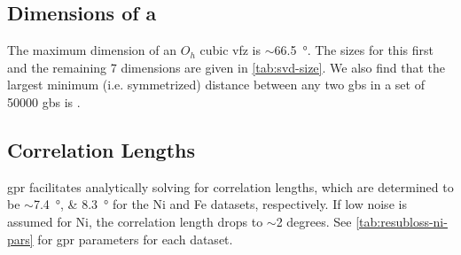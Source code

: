\documentclass[final,twocolumn,12pt]{elsarticle}
\begin{document}
	\subsection{Dimensions of a } \label{sec:results:dimensions}
	
	The maximum dimension of an $O_h$ cubic \gls{vfz} is $\sim$\SI{66.5}{\degree}. The sizes for this first and the remaining 7 dimensions are given in \cref{tab:svd-size}. We also find that the largest minimum (i.e. symmetrized) distance between any two \glspl{gb} in a set of \num{50000} \glspl{gb} is \minsymdist{}.
	
	\begin{table}[!htb]
	    \centering
	    \caption{Caption}
	    \label{tab:svd-size}
	\end{table}
	
	\subsection{Correlation Lengths} \label{sec:results:correlation}
	\Gls{gpr} facilitates analytically solving for correlation lengths, which are determined to be $\sim$\SIlist{7.4;8.3}{\degree} for the Ni and Fe datasets, respectively. If low noise is assumed for Ni, the correlation length drops to $\sim$2 degrees. See \cref{tab:resubloss-ni-pars} for \gls{gpr} parameters for each dataset.
	
	\begin{table}[]
	\centering
	\caption{Fitted parameters for two \gls{gpr} models fitted to the 388 simulated Ni \glspl{gbe} by \citet{olmstedSurveyComputedGrain2009a}. The first model allows $\sigma$ to vary, whereas the second constrains $\sigma$ to be fixed. $\sigma_L$, $\sigma_F$, $\beta$, and $\sigma$ are the kernel length scale ($^\circ{}$), signal standard deviation ($J m^{-2}$), constant basis function ($J m^{-2}$), and input property standard deviation ($J m^{-2}$), respectively. Also, fitted parameters for a \gls{gpr} model trained on 80\% of the Fe simulation data [NEED TO ADD] and a \gls{gpr} model trained on \num{50000} \gls{brk} model \glspl{gbe} are shown [NEED TO ADD].
	}
	\label{tab:resubloss-ni-pars}
    \end{table}
    
\end{document}
